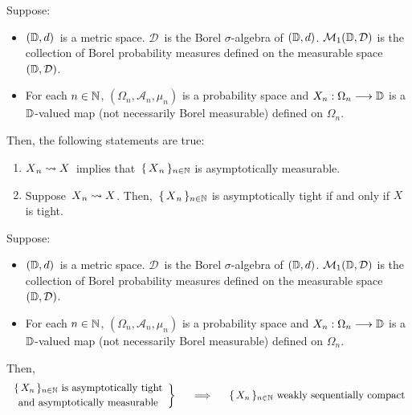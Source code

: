 \begin{proposition}
\mbox{}\vskip 0.1cm
\noindent
Suppose:
\begin{itemize}
\item
	$(\mathbb{D},d)$\, is a metric space.
	$\mathcal{D}$\, is the Borel $\sigma$-algebra of $(\mathbb{D},d)$.
	\vskip 0.0cm
	$\mathcal{M}_{1}(\mathbb{D},\mathcal{D})$ is the collection of Borel probability measures
	defined on the measurable space $(\mathbb{D},\mathcal{D})$.
\item
	For each $n \in \mathbb{N}$,
	$(\Omega_{n},\mathcal{A}_{n},\mu_{n})$ is a probability space and
	$X_{n} : \Omega_{n} \longrightarrow \mathbb{D}$
	is a $\mathbb{D}$-valued map (not necessarily Borel measurable) defined on $\Omega_{n}$.
\end{itemize}
Then, the following statements are true:
\begin{enumerate}
\item
	$\overset{{\color{white}.}}{X}_{n} \wconverge X$\,
	implies that
	\,$\{\,\overset{{\color{white}.}}{X}_{n}\,\}_{n\in\N}$ is asymptotically measurable.
\item
	Suppose \,$\overset{{\color{white}.}}{X}_{n} \wconverge X$.
	Then, \,$\{\,\overset{{\color{white}.}}{X}_{n}\,\}_{n\in\N}$ is asymptotically tight
	if and only if
	$X$ is tight.
\end{enumerate}
\end{proposition}


\begin{theorem}
\mbox{}\vskip 0.1cm
\noindent
Suppose:
\begin{itemize}
\item
	$(\mathbb{D},d)$\, is a metric space.
	$\mathcal{D}$\, is the Borel $\sigma$-algebra of $(\mathbb{D},d)$.
	\vskip 0.0cm
	$\mathcal{M}_{1}(\mathbb{D},\mathcal{D})$ is the collection of Borel probability measures
	defined on the measurable space $(\mathbb{D},\mathcal{D})$.
\item
	For each $n \in \mathbb{N}$,
	$(\Omega_{n},\mathcal{A}_{n},\mu_{n})$ is a probability space and
	$X_{n} : \Omega_{n} \longrightarrow \mathbb{D}$
	is a $\mathbb{D}$-valued map (not necessarily Borel measurable) defined on $\Omega_{n}$.
\end{itemize}
Then,
\begin{equation*}
	\left.\begin{array}{c}
	\textnormal{$\{\,X_{n}\,\}_{n\in\N}$ is asymptotically tight}
	\\
	\overset{{\color{white}.}}{\textnormal{and asymptotically measurable}}
	\end{array}\right\}
\quad\;\;\Longrightarrow\quad
	\begin{array}{c}
	\textnormal{$\{\,X_{n}\,\}_{n\in\N}$ weakly sequentially compact}
	\end{array}
\end{equation*}
\end{theorem}

